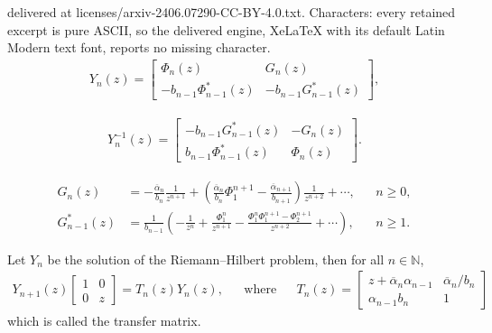 \documentclass[10pt,a4paper]{amsart}
\begin{document}
delivered at licenses/arxiv-2406.07290-CC-BY-4.0.txt. Characters: every retained excerpt is pure ASCII, so the delivered engine, XeLaTeX with its default Latin Modern text font, reports no missing character.
\begin{align}\label{ynnew}
Y_n(z)=\begin{bmatrix}
\Phi_n(z) & G_n(z) \\[.075cm]
-b_{n-1}\Phi^*_{n-1}(z) & -b_{n-1} G^*_{n-1}(z)
\end{bmatrix} ,
\end{align}

\begin{align}\label{inversaynnew}
Y_n^{-1}(z)=\begin{bmatrix}
-b_{n-1} G^*_{n-1}(z) & -G_n(z) \\[.075cm]
b_{n-1}\Phi^*_{n-1}(z) & \Phi_n(z)
\end{bmatrix}.
\end{align}

\begin{align}
 \label{Gninf}
G_n(z)
 & =
-\frac{\overline{\alpha}_n}{b_n}\frac{1}{z^{n+1}}+\left(\frac{\overline{\alpha}_n}{b_n}\Phi_{1}^{n+1}-\frac{\overline{\alpha}_{n+1}}{b_{n+1}}\right)\frac{1}{z^{n+2}}+\cdots , && n \geqslant 0 ,
 \\
\label{Gnestrelainf}
G_{n-1}^*(z) 
 & =
\frac 1{b_{n-1}} \left(-\frac{1}{z^n}+\frac{\Phi_{1}^{n}}{z^{n+1}}-\frac{\Phi_{1}^{n}\Phi_{1}^{n+1}-\Phi_{2}^{n+1}}{z^{n+2}} + \cdots \right) , && n \geqslant 1 .
\end{align}

\begin{proposition}
 Let \( Y_n \) be the solution of the Riemann--Hilbert problem, then for all \( n \in \mathbb N \), 
\begin{align}\label{tn}
Y_{n+1}(z)
 \begin{bmatrix}
1 & 0\\
0 & z
\end{bmatrix}
=T_n(z)Y_n(z),
 && \text{where} &&
T_n(z)=\begin{bmatrix}
z + \overline{\alpha}_n\alpha_{n-1} & 
\displaystyle
{ \overline{\alpha}_n}/{b_{n}}
 \\
\alpha_{n-1} b_n & 1
\end{bmatrix}
\end{align}
which is called the transfer matrix.
\end{proposition}
\end{document}
